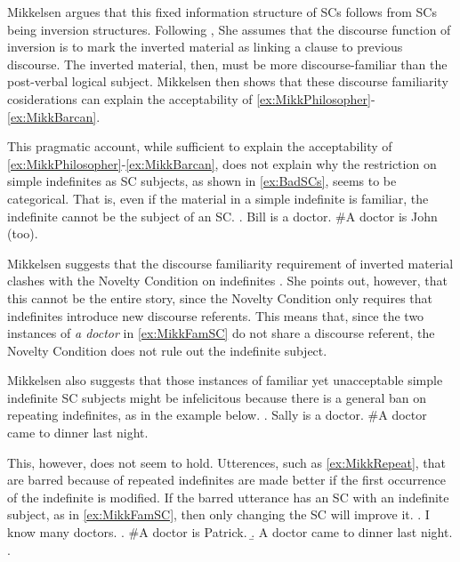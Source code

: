 \documentclass[GPFinal]{subfiles}
\begin{document}
Mikkelsen argues that this fixed information structure of SCs follows from SCs being inversion structures.
Following \textcite{birner1994information,birner1996discourse}, She assumes that the discourse function of inversion is to mark the inverted material as linking a clause to previous discourse.
The inverted material, then, must be more discourse-familiar than the post-verbal logical subject.
Mikkelsen then shows that these discourse familiarity cosiderations can explain the acceptability of \ref{ex:MikkPhilosopher}-\ref{ex:MikkBarcan}.

This pragmatic account, while sufficient to explain the acceptability of \ref{ex:MikkPhilosopher}-\ref{ex:MikkBarcan}, does not explain why the restriction on simple indefinites as SC subjects, as shown in \ref{ex:BadSCs}, seems to be categorical.
That is, even if the material in a simple indefinite is familiar, the indefinite cannot be the subject of an SC.
\ex.\label{ex:MikkFamSC} Bill is a doctor. \#A doctor is John (too).

Mikkelsen suggests that the discourse familiarity requirement of inverted material clashes with the Novelty Condition on indefinites \parencite{heim1982semantics}.
She points out, however, that this cannot be the entire story, since the Novelty Condition only requires that indefinites introduce new discourse referents.
This means that, since the two instances of \textit{a doctor} in \ref{ex:MikkFamSC} do not share a discourse referent, the Novelty Condition does not rule out the indefinite subject.

Mikkelsen also suggests that those instances of familiar yet unacceptable simple indefinite SC subjects might be infelicitous because there is a general ban on repeating indefinites, as in the example below.
\ex.\label{ex:MikkRepeat} Sally is a doctor. \#A doctor came to dinner last night.

This, however, does not seem to hold.
Utterences, such as \ref{ex:MikkRepeat}, that are barred because of repeated indefinites are made better if the first occurrence of the indefinite is modified.
If the barred utterance has an SC with an indefinite subject, as in \ref{ex:MikkFamSC}, then only changing the SC will improve it.
\ex. I know many doctors.
  \a. \#A doctor is Patrick.
  \b. A doctor came to dinner last night.
  \z.
\end{document}
